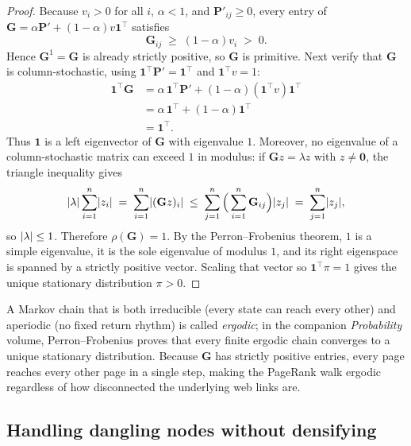 \begin{proof}
Because $v_i > 0$ for all $i$, $\alpha < 1$, and $\mathbf{P}'_{ij} \ge 0$, every entry of $\mathbf{G} = \alpha\mathbf{P}' + (1-\alpha)v\mathbf{1}^\top$ satisfies
\[
  \mathbf{G}_{ij} \;\ge\; (1-\alpha)v_i \;>\; 0.
\]
Hence $\mathbf{G}^1 = \mathbf{G}$ is already strictly positive, so $\mathbf{G}$ is primitive. Next verify that $\mathbf{G}$ is column-stochastic, using $\mathbf{1}^\top \mathbf{P}' = \mathbf{1}^\top$ and $\mathbf{1}^\top v = 1$:
\begin{align*}
  \mathbf{1}^\top \mathbf{G}
  &= \alpha\,\mathbf{1}^\top\mathbf{P}' + (1-\alpha)(\mathbf{1}^\top v)\mathbf{1}^\top \\
  &= \alpha\,\mathbf{1}^\top + (1-\alpha)\mathbf{1}^\top \\
  &= \mathbf{1}^\top.
\end{align*}
Thus $\mathbf{1}$ is a left eigenvector of $\mathbf{G}$ with eigenvalue $1$. Moreover, no eigenvalue of a column-stochastic matrix can exceed $1$ in modulus: if $\mathbf{G}z = \lambda z$ with $z \ne \mathbf{0}$, the triangle inequality gives
\[
  \lvert\lambda\rvert\sum_{i=1}^n \lvert z_i\rvert
  \;=\; \sum_{i=1}^n \lvert(\mathbf{G}z)_i\rvert
  \;\le\; \sum_{j=1}^n \Big(\sum_{i=1}^n \mathbf{G}_{ij}\Big)\lvert z_j\rvert
  \;=\; \sum_{j=1}^n \lvert z_j\rvert,
\]
so $\lvert\lambda\rvert \le 1$. Therefore $\rho(\mathbf{G}) = 1$. By the Perron--Frobenius theorem, $1$ is a simple eigenvalue, it is the sole eigenvalue of modulus $1$, and its right eigenspace is spanned by a strictly positive vector. Scaling that vector so $\mathbf{1}^\top \pi = 1$ gives the unique stationary distribution $\pi > 0$.
\end{proof}

\begin{connectionbox}
A Markov chain that is both irreducible (every state can reach every other) and aperiodic (no fixed return rhythm) is called \emph{ergodic}; in the companion \emph{Probability} volume, Perron--Frobenius proves that every finite ergodic chain converges to a unique stationary distribution. Because $\mathbf{G}$ has strictly positive entries, every page reaches every other page in a single step, making the PageRank walk ergodic regardless of how disconnected the underlying web links are.
\end{connectionbox}

\subsection{Handling dangling nodes without densifying}

